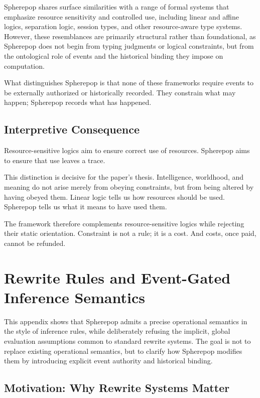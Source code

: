\documentclass[11pt]{article}
\begin{document}
Spherepop shares surface similarities with a range of formal systems that emphasize resource sensitivity and controlled use, including linear and affine logics, separation logic, session types, and other resource-aware type systems. However, these resemblances are primarily structural rather than foundational, as Spherepop does not begin from typing judgments or logical constraints, but from the ontological role of events and the historical binding they impose on computation.

What distinguishes Spherepop is that none of these frameworks require events to be externally authorized or historically recorded. They constrain what may happen; Spherepop records what has happened.

\subsection{Interpretive Consequence}

Resource-sensitive logics aim to ensure correct use of resources. Spherepop aims to ensure that use leaves a trace.

This distinction is decisive for the paper’s thesis. Intelligence, worldhood, and meaning do not arise merely from obeying constraints, but from being altered by having obeyed them. Linear logic tells us how resources should be used. Spherepop tells us what it means to have used them.

The framework therefore complements resource-sensitive logics while rejecting their static orientation. Constraint is not a rule; it is a cost. And costs, once paid, cannot be refunded.

\section{Rewrite Rules and Event-Gated Inference Semantics}

This appendix shows that Spherepop admits a precise operational semantics in the style of inference rules, while deliberately refusing the implicit, global evaluation assumptions common to standard rewrite systems. The goal is not to replace existing operational semantics, but to clarify how Spherepop modifies them by introducing explicit event authority and historical binding.

\subsection{Motivation: Why Rewrite Systems Matter}
\end{document}
